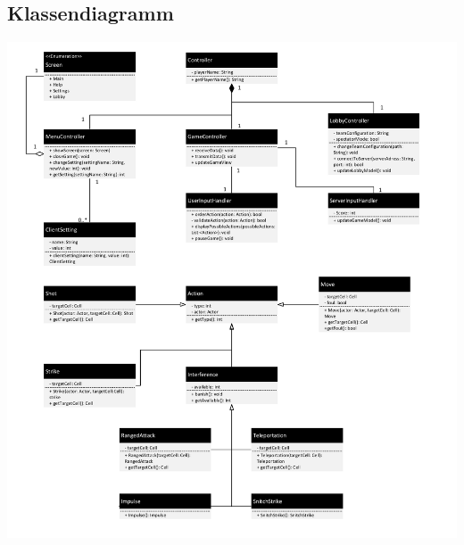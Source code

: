 \subsection{Klassendiagramm}
\begin{center}
	\includegraphics[width=16.8cm]{images/Klassendiagram_Controller}
\end{center}
